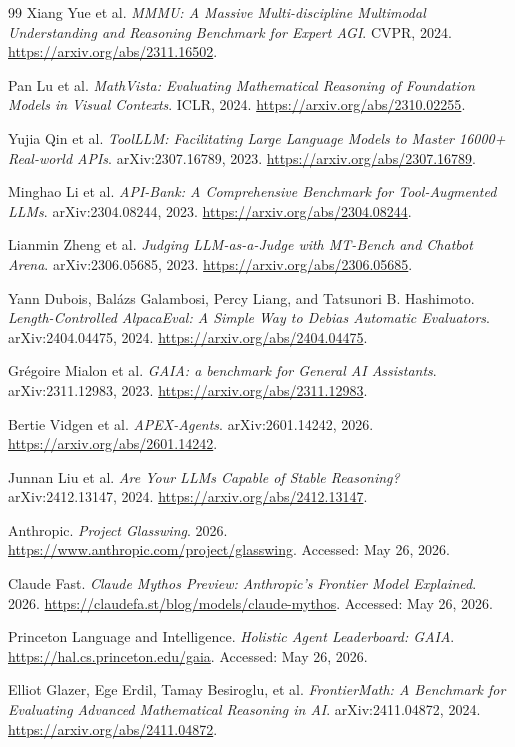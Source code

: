 \documentclass[10pt,letterpaper,twocolumn]{article}
\begin{document}
\begin{thebibliography}{99}
Xiang Yue et al.
\emph{MMMU: A Massive Multi-discipline Multimodal Understanding and Reasoning Benchmark for Expert AGI}.
CVPR, 2024.
\url{https://arxiv.org/abs/2311.16502}.

Pan Lu et al.
\emph{MathVista: Evaluating Mathematical Reasoning of Foundation Models in Visual Contexts}.
ICLR, 2024.
\url{https://arxiv.org/abs/2310.02255}.

Yujia Qin et al.
\emph{ToolLLM: Facilitating Large Language Models to Master 16000+ Real-world APIs}.
arXiv:2307.16789, 2023.
\url{https://arxiv.org/abs/2307.16789}.

Minghao Li et al.
\emph{API-Bank: A Comprehensive Benchmark for Tool-Augmented LLMs}.
arXiv:2304.08244, 2023.
\url{https://arxiv.org/abs/2304.08244}.

Lianmin Zheng et al.
\emph{Judging LLM-as-a-Judge with MT-Bench and Chatbot Arena}.
arXiv:2306.05685, 2023.
\url{https://arxiv.org/abs/2306.05685}.

Yann Dubois, Balázs Galambosi, Percy Liang, and Tatsunori B. Hashimoto.
\emph{Length-Controlled AlpacaEval: A Simple Way to Debias Automatic Evaluators}.
arXiv:2404.04475, 2024.
\url{https://arxiv.org/abs/2404.04475}.

Grégoire Mialon et al.
\emph{GAIA: a benchmark for General AI Assistants}.
arXiv:2311.12983, 2023.
\url{https://arxiv.org/abs/2311.12983}.

Bertie Vidgen et al.
\emph{APEX-Agents}. arXiv:2601.14242, 2026.
\url{https://arxiv.org/abs/2601.14242}.

Junnan Liu et al.
\emph{Are Your LLMs Capable of Stable Reasoning?}
arXiv:2412.13147, 2024.
\url{https://arxiv.org/abs/2412.13147}.

Anthropic.
\emph{Project Glasswing}.
2026.
\url{https://www.anthropic.com/project/glasswing}.
Accessed: May 26, 2026.

Claude Fast.
\emph{Claude Mythos Preview: Anthropic's Frontier Model Explained}.
2026.
\url{https://claudefa.st/blog/models/claude-mythos}.
Accessed: May 26, 2026.

Princeton Language and Intelligence.
\emph{Holistic Agent Leaderboard: GAIA}.
\url{https://hal.cs.princeton.edu/gaia}. Accessed: May 26, 2026.

Elliot Glazer, Ege Erdil, Tamay Besiroglu, et al.
\emph{FrontierMath: A Benchmark for Evaluating Advanced Mathematical
Reasoning in AI}. arXiv:2411.04872, 2024.
\url{https://arxiv.org/abs/2411.04872}.


\end{thebibliography}
\end{document}

